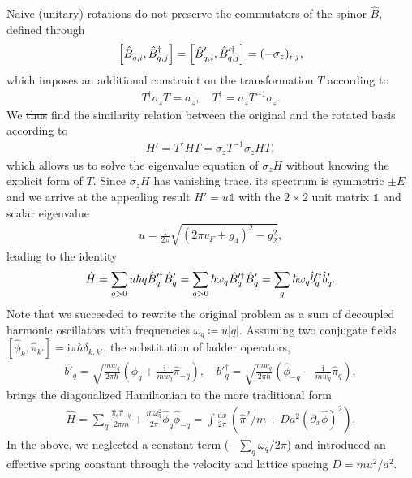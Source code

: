 \documentclass{svmono}
\def\ri{\mathrm i}
\def\rd{\mathrm d}
\def\pdag{{\vphantom\dag}}
\newcommand{\commutator}[1]{\left[ #1 \right]}
\newcommand{\brlr}[1]{\left( #1 \right)}
\providecommand{\DIFdeltex}[1]{{\protect\color{red}\sout{#1}}}                      %
\providecommand{\DIFdelbegin}{} %
\providecommand{\DIFdelend}{} %
\providecommand{\DIFdel}[1]{\texorpdfstring{\DIFdeltex{#1}}{}} %
\newcommand{\DIFscaledelfig}{0.5}
\newlength{\DIFdelgraphicswidth} %
\newlength{\DIFdelgraphicsheight} %
\newcommand{\DIFdelincludegraphics}[2][]{%
\sbox{\DIFdelgraphicsbox}{\DIFOincludegraphics[#1]{#2}}%
\settoboxwidth{\DIFdelgraphicswidth}{\DIFdelgraphicsbox} %
\settoboxtotalheight{\DIFdelgraphicsheight}{\DIFdelgraphicsbox} %
\scalebox{\DIFscaledelfig}{%
\parbox[b]{\DIFdelgraphicswidth}{\usebox{\DIFdelgraphicsbox}\\[-\baselineskip] \rule{\DIFdelgraphicswidth}{0em}}\llap{\resizebox{\DIFdelgraphicswidth}{\DIFdelgraphicsheight}{%
\setlength{\unitlength}{\DIFdelgraphicswidth}%
\begin{picture}(1,1)%
\thicklines\linethickness{2pt} %
{\color[rgb]{1,0,0}\put(0,0){\framebox(1,1){}}}%
{\color[rgb]{1,0,0}\put(0,0){\line( 1,1){1}}}%
{\color[rgb]{1,0,0}\put(0,1){\line(1,-1){1}}}%
\end{picture}%
}\hspace*{3pt}}} %
} %
\DeclareRobustCommand{\DIFdelbegin}{\DIFOdelbegin \let\includegraphics\DIFdelincludegraphics} %
\DeclareRobustCommand{\DIFdelend}{\DIFOaddend \let\includegraphics\DIFOincludegraphics} %
\begin{document}
Naive (unitary) rotations do not preserve the commutators of the spinor $\hat B$, defined through
\begin{align}
    \commutator{\hat B_{q,i}^\pdag,\hat B^\dag_{q,j}} = \commutator{\hat B_{q,i}'^\pdag,\hat B'^\dag_{q,j}} = (-\sigma_z)_{i,j},
\end{align}
which imposes an additional constraint on the transformation $T$ according to
\begin{align}
    T^\dag\sigma_z T = \sigma_z,
    \quad
    T^\dag = \sigma_zT^{-1}\sigma_z.
\end{align}
We \DIFdelbegin \DIFdel{thus }\DIFdelend find the similarity relation between the original and the rotated basis according to
\begin{align}
    H'=T^\dag HT =\sigma_z T^{-1}\sigma_z H T,
\end{align}
which allows us to solve the eigenvalue equation of $\sigma_z H$ without knowing the explicit form of $T$.
Since $\sigma_zH$ has vanishing trace, its spectrum is symmetric $\pm E$ and we arrive at the appealing result $H' = u\mathbb1$ with the $2\times2$ unit matrix $\mathbb1$ and scalar eigenvalue
\begin{align}
    u = \frac1{2\pi}\sqrt{\brlr{2\pi v_F + g_4}^2 - g_2^2},
\end{align}
leading to the identity
\begin{align}
    \hat H = \sum_{q>0} u\hbar q \hat B'^\dag_q \hat B'^\pdag_q = \sum_{q>0} \hbar \omega_q \hat B'^\dag_q \hat B'^\pdag_q = \sum_q \hbar  \omega_q \hat b'^\dag_q\hat b'^\pdag_q.
\end{align}
Note that we succeeded to rewrite the original problem as a sum of decoupled harmonic oscillators with frequencies $\omega_q\coloneqq u|q|$.
Assuming two conjugate fields $\commutator{\hat \phi_{k},\hat \pi_{k'}} = \ri\pi\hbar\delta_{k,k'}$, the substitution of ladder operators,
\begin{align}
    \hat b'_q = \sqrt{\frac{mw_q}{2\pi\hbar}}\brlr{\hat\phi_q + \frac{\ri}{mw_q}\hat\pi_{-q}},
    \quad
    \hat b'^\dag_q = \sqrt{\frac{mw_q}{2\pi\hbar}}\brlr{\hat\phi_{-q} - \frac{\ri}{mw_q}\hat\pi_{q}},
\end{align}
brings the diagonalized Hamiltonian to the more traditional form
\begin{align}
    \hat H = \sum_q \frac{\hat\pi_q\hat\pi_{-q}}{2\pi m} + \frac{m\omega_q^2}{2\pi}\hat\phi_q\hat\phi_{-q}
    =
    \int\frac{\rd x}{2\pi}\, \brlr{\hat\pi^2/m + {Da^2}(\partial_x\hat\phi)^2}.
\end{align}
In the above, we neglected a constant term ($-\sum_q\omega_q/2\pi$) and introduced an effective spring constant through the velocity and lattice spacing $D=mu^2/a^2$.
\end{document}
